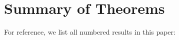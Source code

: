 \documentclass[12pt]{article}
\theoremstyle{definition}
\theoremstyle{remark}
\begin{document}

\newpage





\appendix

\section{Summary of Theorems}
\label{app:theorems}

For reference, we list all numbered results in this paper:
\end{document}
